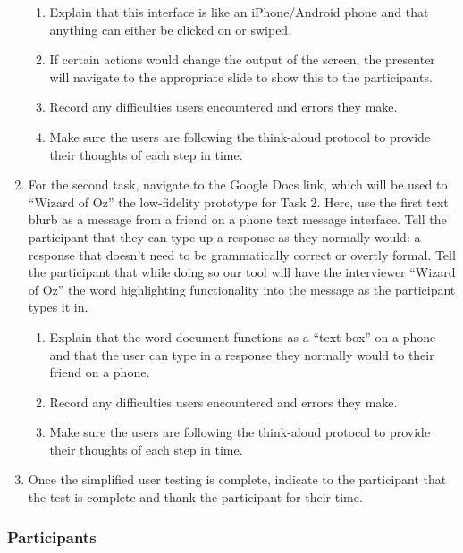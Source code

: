 \documentclass[acmsmall,screen,authorversion,nonacm]{acmart}
\begin{document}
\begin{enumerate}
    \begin{enumerate}[a]
        \item Explain that this interface is like an iPhone/Android phone and that anything can either be clicked on or swiped.
        \item If certain actions would change the output of the screen, the presenter will navigate to the appropriate slide to show this to the participants.
        \item Record any difficulties users encountered and errors they make.
        \item Make sure the users are following the think-aloud protocol to provide their thoughts of each step in time. 
    \end{enumerate}
    \item For the second task, navigate to the Google Docs link, which will be used to “Wizard of Oz” the low-fidelity prototype for Task 2. Here, use the first text blurb as a message from a friend on a phone text message interface. Tell the participant that they can type up a response as they normally would: a response that doesn’t need to be grammatically correct or overtly formal. Tell the participant that while doing so our tool will have the interviewer “Wizard of Oz” the word highlighting functionality into the message as the participant types it in.
    \begin{enumerate}[a]
        \item Explain that the word document functions as a “text box” on a phone and that the user can type in a response they normally would to their friend on a phone.
        \item Record any difficulties users encountered and errors they make.
        \item Make sure the users are following the think-aloud protocol to provide their thoughts of each step in time.
    \end{enumerate}
    \item Once the simplified user testing is complete, indicate to the participant that the test is complete and thank the participant for their time.
\end{enumerate}

\subsubsection{Participants}
\end{document}
